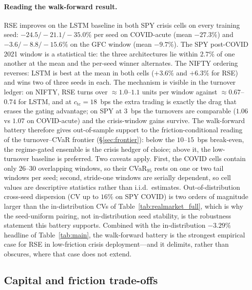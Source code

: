 \documentclass[10pt,letterpaper]{article}
\begin{document}
\paragraph{Reading the walk-forward result.}
RSE improves on the LSTM baseline in both SPY crisis cells on
every training seed: $-24.5/-21.1/-35.0\%$ per seed on COVID-acute
(mean $-27.3\%$) and $-3.6/-8.8/-15.6\%$ on the GFC window (mean
$-9.7\%$). The SPY post-COVID 2021 window is a statistical tie:
the three architectures lie within $2.7\%$ of one another at the
mean and the per-seed winner alternates. The NIFTY ordering
reverses: LSTM is best at the mean in both cells ($+3.6\%$ and
$+6.3\%$ for RSE) and wins two of three seeds in each. The
mechanism is visible in the turnover ledger: on NIFTY, RSE turns
over $\approx\! 1.0$--$1.1$ units per window against
$\approx\! 0.67$--$0.74$ for LSTM, and at
$c_{\mathrm{tc}}=18$~bps the extra trading is exactly the drag
that erases the gating advantage; on SPY at $3$~bps the turnovers
are comparable ($1.06$ vs $1.07$ on COVID-acute) and the
crisis-window gains survive. The walk-forward battery therefore
gives out-of-sample support to the friction-conditional reading of
the turnover--CVaR frontier (\S\ref{sec:frontier}): below the
$10$--$15$~bps break-even, the regime-gated ensemble is the crisis
hedger of choice; above it, the low-turnover baseline is
preferred. Two caveats apply. First, the COVID cells contain only
$26$--$30$ overlapping windows, so their CVaR$_{95}$ rests on one
or two tail windows per seed; second, stride-one windows are
serially dependent, so cell values are descriptive statistics
rather than i.i.d.\ estimates. Out-of-distribution cross-seed
dispersion (CV up to $16\%$ on SPY COVID) is two orders of
magnitude larger than the in-distribution CVs of
Table~\ref{tab:realmarket_full}, which is why the seed-uniform
pairing, not in-distribution seed stability, is the robustness
statement this battery supports. Combined with the
in-distribution $-3.29\%$ headline of Table~\ref{tab:main}, the
walk-forward battery is the strongest empirical case for RSE in
low-friction crisis deployment---and it delimits, rather than
obscures, where that case does not extend.

\subsection{Capital and friction trade-offs}\label{sec:capital}
\end{document}
